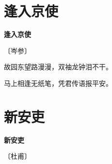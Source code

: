 \documentclass[12pt,UTF-8,openany,fontset=none]{ctexbook}
\begin{document}
\vspace{8pt}
\clearpage

\section{逢入京使}


\begin{center}
    {\bfseries 逢入京使}

    \vspace{18pt}

    \begin{large}\xuwen
        〔岑参〕
    \end{large}

\end{center}

    \vspace{18pt}

\begin{center}
    \begin{Large}

        故园东望路漫漫，双袖龙钟泪不干。

        马上相逢无纸笔，凭君传语报平安。

    \end{Large}

\end{center}

\vspace{8pt}
\clearpage

\section{新安吏}


\begin{center}
    {\bfseries 新安吏}

    \vspace{18pt}

    \begin{large}\xuwen
        〔杜甫〕
    \end{large}

\end{center}

    \vspace{18pt}  %
\end{document}
